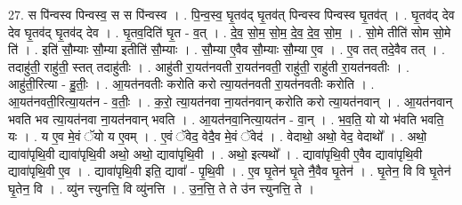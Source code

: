 \documentclass[17pt]{extarticle}
\begin{document}
27. स पि॑न्वस्व पिन्वस्व॒ स स पि॑न्वस्व । . पि॒न्व॒स्व॒ घृ॒तव॑द् घृ॒तव॑त् पिन्वस्व पिन्वस्व घृ॒तव॑त् । . घृ॒तव॑द् देव देव घृ॒तव॑द् घृ॒तव॑द् देव । . घृ॒तव॒दिति॑ घृ॒त - व॒त् । . दे॒व॒ सो॒म॒ सो॒म॒ दे॒व॒ दे॒व॒ सो॒म॒ । . सो॒मे तीति॑ सोम सो॒मे ति॑ । . इति॑ सौ॒म्याः सौ॒म्या इतीति॑ सौ॒म्याः । . सौ॒म्या ए॒वैव सौ॒म्याः सौ॒म्या ए॒व । . ए॒व तत् तदे॒वैव तत् । . तदाहु॑ती॒ राहु॑ती॒ स्तत् तदाहु॑तीः । . आहु॑ती रा॒यत॑नवती रा॒यत॑नवती॒ राहु॑ती॒ राहु॑ती रा॒यत॑नवतीः । . आहु॑ती॒रित्या - हु॒तीः॒ । . आ॒यत॑नवतीः करोति करो त्या॒यत॑नवती रा॒यत॑नवतीः करोति । . आ॒यत॑नवती॒रित्या॒यत॑न - व॒तीः॒ । . क॒रो॒ त्या॒यत॑नवा ना॒यत॑नवान् करोति करो त्या॒यत॑नवान् । . आ॒यत॑नवान् भवति भव त्या॒यत॑नवा ना॒यत॑नवान् भवति । . आ॒यत॑नवा॒नित्या॒यत॑न - वा॒न् । . भ॒व॒ति॒ यो यो भ॑वति भवति॒ यः । . य ए॒व मे॒वं ॅयो य ए॒वम् । . ए॒वं ॅवेद॒ वेदै॒व मे॒वं ॅवेद॑ । . वेदाथो॒ अथो॒ वेद॒ वेदाथो᳚ । . अथो॒ द्यावा॑पृथि॒वी द्यावा॑पृथि॒वी अथो॒ अथो॒ द्यावा॑पृथि॒वी । . अथो॒ इत्यथो᳚ । . द्यावा॑पृथि॒वी ए॒वैव द्यावा॑पृथि॒वी द्यावा॑पृथि॒वी ए॒व । . द्यावा॑पृथि॒वी इति॒ द्यावा᳚ - पृ॒थि॒वी । . ए॒व घृ॒तेन॑ घृ॒ते नै॒वैव घृ॒तेन॑ । . घृ॒तेन॒ वि वि घृ॒तेन॑ घृ॒तेन॒ वि । . व्यु॑न त्त्युनत्ति॒ वि व्यु॑नत्ति । . उ॒न॒त्ति॒ ते ते उ॑न त्त्युनत्ति॒ ते । \newline
\end{document}
